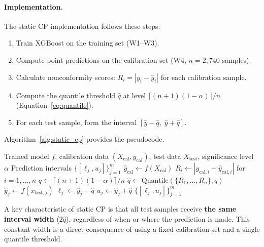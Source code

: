 \paragraph{Implementation.}
The static CP implementation follows these steps:
\begin{enumerate}
    \item Train XGBoost on the training set (W1--W3).
    \item Compute point predictions on the calibration set (W4, $n = 2{,}740$ samples).
    \item Calculate nonconformity scores: $R_i = |y_i - \hat{y}_i|$ for each calibration sample.
    \item Compute the quantile threshold $\hat{q}$ at level $\lceil (n+1)(1-\alpha) \rceil / n$ (Equation~\ref{eq:quantile}).
    \item For each test sample, form the interval $[\hat{y} - \hat{q},\; \hat{y} + \hat{q}]$.
\end{enumerate}

Algorithm~\ref{alg:static_cp} provides the pseudocode.

\begin{algorithm}[htbp]
\caption{Static (Split) Conformal Prediction}
\label{alg:static_cp}
\begin{algorithmic}[1]
\REQUIRE Trained model $f$, calibration data $(X_{\text{cal}}, y_{\text{cal}})$, test data $X_{\text{test}}$, significance level $\alpha$
\ENSURE Prediction intervals $\{[\ell_j, u_j]\}_{j=1}^{m}$
\STATE $\hat{y}_{\text{cal}} \leftarrow f(X_{\text{cal}})$ 
\STATE $R_i \leftarrow |y_{\text{cal},i} - \hat{y}_{\text{cal},i}|$ for $i = 1, \ldots, n$ 
\STATE $q \leftarrow \lceil (n+1)(1-\alpha) \rceil / n$
\STATE $\hat{q} \leftarrow \text{Quantile}(\{R_1, \ldots, R_n\}, q)$ 
    \STATE $\hat{y}_j \leftarrow f(x_{\text{test},j})$
    \STATE $\ell_j \leftarrow \hat{y}_j - \hat{q}$
    \STATE $u_j \leftarrow \hat{y}_j + \hat{q}$
\ENDFOR
\RETURN $\{[\ell_j, u_j]\}_{j=1}^{m}$
\end{algorithmic}
\end{algorithm}

A key characteristic of static CP is that all test samples receive \textbf{the same interval width} ($2\hat{q}$), regardless of when or where the prediction is made. This constant width is a direct consequence of using a fixed calibration set and a single quantile threshold.

